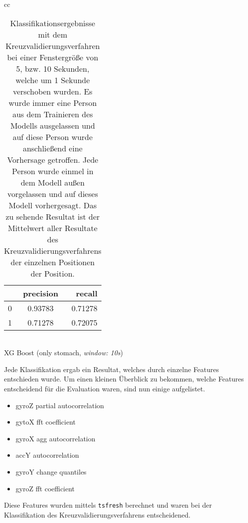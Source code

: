 \begin{table}
\begin{tabular}{cc}
      \begin{minipage}{0.33\textwidth}
          \begin{center}
              \begin{tabular}{ | l | c | r | }
                \hline
                 & precision & recall \\ \hline
                0 & 0.93783 & 0.71278 \\ \hline
                1 & 0.71278 & 0.72075 \\
                \hline
              \end{tabular}
              \smallskip 
              \\ XG Boost (only stomach, \textit{window: 10s})
          \end{center}
      \end{minipage}
  \end{tabular}
  \caption{Klassifikationsergebnisse mit dem Kreuzvalidierungsverfahren bei einer Fenstergröße von 5, bzw. 10 Sekunden, welche um 1 Sekunde verschoben wurden. Es wurde immer eine Person aus dem Trainieren des Modells ausgelassen und auf diese Person wurde anschließend eine Vorhersage getroffen. Jede Person wurde einmel in dem Modell außen vorgelassen und auf dieses Modell vorhergesagt. Das zu sehende Resultat ist der Mittelwert aller Resultate des Kreuzvalidierungsverfahrens der einzelnen Positionen der Position.}
  \label{evaluation:loso_classification_results}
  \end{table}


Jede Klassifikation ergab ein Resultat, welches durch einzelne Features entschieden wurde. 
Um einen kleinen Überblick zu bekommen, welche Features entscheidend für die Evaluation waren, sind nun einige aufgelistet.
\begin{itemize}
    \item gyroZ partial autocorrelation
    \item gytoX fft coefficient
    \item gyroX agg autocorrelation
    \item accY autocorrelation
    \item gyroY change quantiles 
    \item gyroZ fft coefficient
\end{itemize}
Diese Features wurden mittels \texttt{tsfresh} berechnet und waren bei der Klassifikation des Kreuzvalidierungsverfahrens entscheidened.



